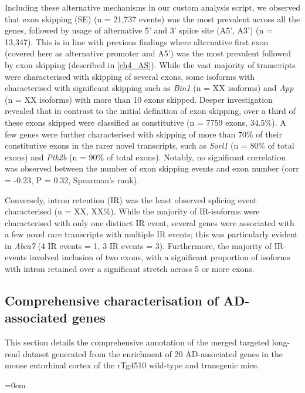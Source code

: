 Including these alternative mechanisms in our custom analysis script, we observed that exon skipping (SE) (n = 21,737 events) was the most prevalent across all the genes, followed by usage of alternative 5' and 3' splice site (A5', A3') (n = 13,347). This is in line with previous findings where alternative first exon (covered here as alternative promoter and A5') was the most prevalent followed by exon skipping (described in \cref{ch4_AS}). While the vast majority of transcripts were characterised with skipping of several exons, some isoforms with characterised with significant skipping such as \textit{Bin1} (n = XX isoforms) and \textit{App} (n = XX isoforms) with more than 10 exons skipped. Deeper investigation revealed that in contrast to the initial definition of exon skipping, over a third of these exons skipped were classified as constitutive (n = 7759 exons, 34.5\%). A few genes were further characterised with skipping of more than 70\% of their constitutive exons in the rarer novel transcripts, such as \textit{Sorl1} (n = 80\% of total exons) and \textit{Ptk2b} (n = 90\% of total exons). Notably, no significant correlation was observed between the number of exon skipping events and exon number (corr = -0.23, P = 0.32, Spearman's rank). 

Conversely, intron retention (IR) was the least observed splicing event characterised (n = XX, XX\%). While the majority of IR-isoforms were characterised with only one distinct IR event, several genes were associated with a few novel rare transcripts with multiple IR events; this was particularly evident in \textit{Abca7} (4 IR events = 1, 3 IR events = 3). Furthermore, the majority of IR-events involved inclusion of two exons, with a significant proportion of isoforms with intron retained over a significant stretch across 5 or more exons. 

\clearpage
\subsection{Comprehensive characterisation of AD-associated genes} 
\label{ch6: target_gene_annotation}
This section details the comprehensive annotation of the merged targeted long-read dataset generated from the enrichment of 20 AD-associated genes in the mouse entorhinal cortex of the rTg4510 wild-type and transgenic mice. 

\vspace{1cm}
\begingroup
\parindent=0em
\localtableofcontents 
\endgroup

